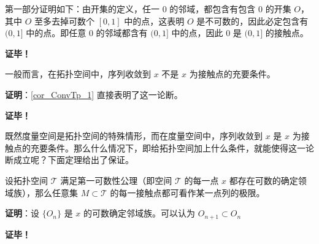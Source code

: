 第一部分证明如下：由开集的定义，任一 $0$ 的邻域，都包含有包含 $0$ 的开集 $O$，其中 $O$ 至多去掉可数个 $[0,1]$ 中的点，这表明 $O$ 是不可数的，因此必定包含有 $(0,1]$ 中的点。即任意 $0$ 的邻域都含有 $(0,1]$ 中的点，因此 $0$ 是 $(0,1]$ 的接触点。 

\textbf{证毕！}


 \begin{theorem}{}
 一般而言，在拓扑空间中，序列收敛到 $x$ 不是 $x$ 为接触点的充要条件。
 \end{theorem}
 \textbf{证明}：\autoref{cor_ConvTp_1} 直接表明了这一论断。

 \textbf{证毕！}

既然度量空间是拓扑空间的特殊情形，而在度量空间中，序列收敛到 $x$ 是 $x$ 为接触点的充要条件。那么什么情况下，即给拓扑空间加上什么条件，就能使得这一论断成立呢？下面定理给出了保证。


\begin{theorem}{}
设拓扑空间 $\mathcal T$ 满足第一可数性公理（即空间 $\mathcal T$ 的每一点 $x$ 都存在可数的确定领域族），那么任意集 $M\subset\mathcal T$ 的每一接触点都可看作某一点列的极限。
\end{theorem}

 \textbf{证明}：设 $\{O_n\}$ 是 $x$ 的可数确定邻域族。可以认为 $O_{n+1}\subset O_n$

 \textbf{证毕！}



